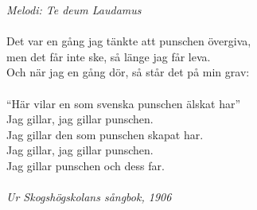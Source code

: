{\footnotesize\textit{Melodi: Te deum Laudamus}}\\
\\
Det var en gång jag tänkte att punschen övergiva,\\
men det får inte ske, så länge jag får leva.\\
Och när jag en gång dör, så står det på min grav:\\
\\
``Här vilar en som svenska punschen älskat har''\\
Jag gillar, jag gillar punschen.\\
Jag gillar den som punschen skapat har.\\
Jag gillar, jag gillar punschen.\\
Jag gillar punschen och dess far.\\
\\
{\footnotesize\textit{Ur Skogshögskolans sångbok, 1906}}

